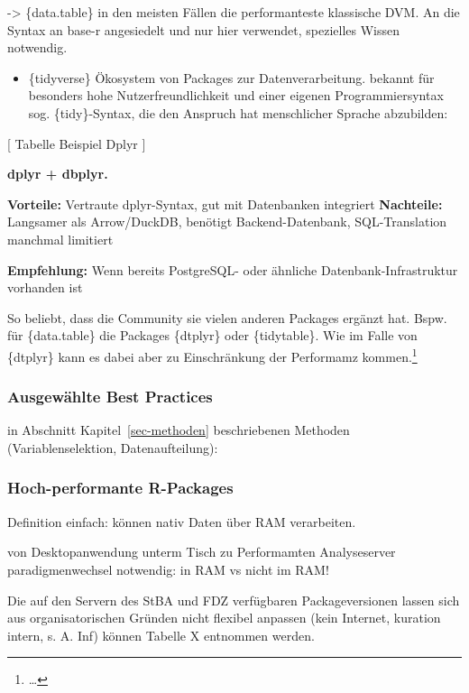 \documentclass[
  german,
  10pt,
  twoside]{article}
\providecommand{\tightlist}{%
  \setlength{\itemsep}{0pt}\setlength{\parskip}{0pt}}
\let\oldref\ref
\renewcommand{\ref}[1]{\oldref{#1}\raisebox{-0.2ex}{\scriptsize\color{wistaBlue}\ding{247}}}
\begin{document}
-\textgreater{} \{data.table\} in den meisten Fällen die performanteste
klassische DVM. An die Syntax an base-r angesiedelt und nur hier
verwendet, spezielles Wissen notwendig.

\begin{itemize}
\tightlist
\item
  \{tidyverse\} Ökosystem von Packages zur Datenverarbeitung. bekannt
  für besonders hohe Nutzerfreundlichkeit und einer eigenen
  Programmiersyntax sog. \{tidy\}-Syntax, die den Anspruch hat
  menschlicher Sprache abzubilden:
\end{itemize}

{[} Tabelle Beispiel Dplyr {]}

\textbf{dplyr + dbplyr.}

\textbf{Vorteile:} Vertraute dplyr-Syntax, gut mit Datenbanken
integriert \textbf{Nachteile:} Langsamer als Arrow/DuckDB, benötigt
Backend-Datenbank, SQL-Translation manchmal limitiert

\textbf{Empfehlung:} Wenn bereits PostgreSQL- oder ähnliche
Datenbank-Infrastruktur vorhanden ist

So beliebt, dass die Community sie vielen anderen Packages ergänzt hat.
Bspw. für \{data.table\} die Packages \{dtplyr\} oder \{tidytable\}. Wie
im Falle von \{dtplyr\} kann es dabei aber zu Einschränkung der
Performamz kommen.\footnote{\ldots{}}

\subsubsection{Ausgewählte Best
Practices}\label{ausgewuxe4hlte-best-practices}

in Abschnitt Kapitel~\ref{sec-methoden} beschriebenen Methoden
(Variablenselektion, Datenaufteilung):

\subsubsection{Hoch-performante
R-Packages}\label{hoch-performante-r-packages}

Definition einfach: können nativ Daten über RAM verarbeiten.

von Desktopanwendung unterm Tisch zu Performamten Analyseserver
paradigmenwechsel notwendig: in RAM vs nicht im RAM!

Die auf den Servern des StBA und FDZ verfügbaren Packageversionen lassen
sich aus organisatorischen Gründen nicht flexibel anpassen (kein
Internet, kuration intern, s. A. Inf) können Tabelle X entnommen werden.
\end{document}
